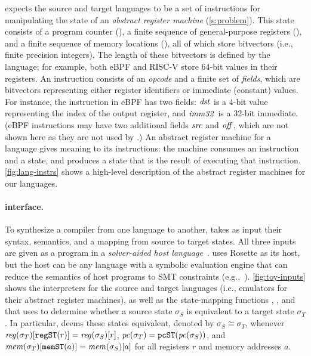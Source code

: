 \jitsynth expects the source and target languages to be a set of instructions
for manipulating the state of an \emph{abstract register machine}
(\autoref{s:problem}). This state consists of a program counter (\pc), a finite
sequence of general-purpose registers (\regs), and a finite sequence of memory
locations (\mem), all of which store bitvectors (i.e., finite precision
integers). The length of these bitvectors is defined by the language; for
example, both eBPF and RISC-V store 64-bit values in their registers. An
instruction consists of an \emph{opcode} and a finite set of \emph{fields},
which are bitvectors representing either register identifiers or immediate
(constant) values. For instance, the  instruction in eBPF
has two fields: $\mathit{dst}$ is a 4-bit value representing the index of the
output register, and $\mathit{imm32}$ is a 32-bit immediate.
(eBPF instructions may have two additional fields $\mathit{src}$ and $\mathit{off}$,
which are not shown here as they are not used by .)
An abstract
register machine for a language gives meaning to its instructions: the machine
consumes an instruction and a state, and produces a state that is the result of
executing that instruction. \autoref{fig:lang-instrs} shows a high-level
description of the abstract register machines for our languages.\tighten

\paragraph{\jitsynth interface.}

To synthesize a compiler from one language to another, \jitsynth takes as input
their syntax, semantics, and a mapping from source to target states. All three
inputs are given as a program in a \emph{solver-aided host
language}~\cite{torlak:rosette}. \jitsynth uses Rosette as its host, but the
host can be any language with a symbolic
evaluation engine that can reduce the semantics of host programs to SMT
constraints (e.g.,~\cite{solar-lezama:sketch}).
\autoref{fig:toy-inputs} shows the interpreters for the source and
target languages (i.e., emulators for their abstract register machines), as well
as the state-mapping functions , , and  that
\jitsynth uses to determine whether a source state $\sigma_S$ is equivalent to a
target state $\sigma_T$. In particular, \jitsynth deems these states equivalent,
denoted by $\sigma_S \cong \sigma_T$, whenever 
%
$\mathit{reg}(\sigma_T)[\texttt{regST}(r)] = \mathit{reg}(\sigma_S)[r]$, $\mathit{pc}(\sigma_T) =
\texttt{pcST}(\mathit{pc}(\sigma_S))$, and $\mathit{mem}(\sigma_T)[\texttt{memST}(a)] =
\mathit{mem}(\sigma_S)[a]$ 
%
for all registers $r$ and memory addresses $a$.\tighten

